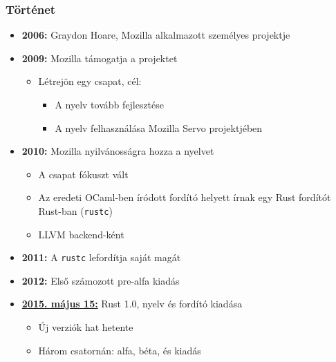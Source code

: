 \documentclass{beamer}
\begin{document}
    \begin{frame}[fragile]
        \frametitle{Történet}

        \begin{itemize}
            \item \textbf{2006:} Graydon Hoare, Mozilla alkalmazott személyes projektje
            \item \textbf{2009:} Mozilla támogatja a projektet \begin{itemize}
                \item Létrejön egy csapat, cél: \begin{itemize}
                    \item A nyelv tovább fejlesztése
                    \item A nyelv felhasználása Mozilla Servo projektjében
                \end{itemize}
            \end{itemize}
            \item \textbf{2010:} Mozilla nyilvánosságra hozza a nyelvet \begin{itemize}
                \item A csapat fókuszt vált
                \item Az eredeti OCaml-ben íródott fordító helyett írnak egy Rust fordítót Rust-ban (\texttt{rustc})
                \item LLVM backend-ként
            \end{itemize}
            \item \textbf{2011:} A \texttt{rustc} lefordítja saját magát
            \item \textbf{2012:} Első számozott pre-alfa kiadás
            \item \underline{\textbf{2015. május 15:}} Rust 1.0, nyelv és fordító kiadása \begin{itemize}
                \item Új verziók hat hetente
                \item Három csatornán: alfa, béta, és kiadás
            \end{itemize}
        \end{itemize}
    \end{frame}
\end{document}
